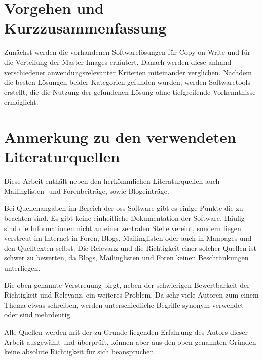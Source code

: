\section{Vorgehen und Kurzzusammenfassung} 

Zunächst werden die vorhandenen Softwarelösungen für Copy-on-Write und für die Verteilung der Master-Images erläutert. Danach werden diese anhand verschiedener anwendungsrelevanter Kriterien miteinander verglichen. Nachdem die besten Lösungen beider Kategorien gefunden wurden, werden Softwaretools erstellt, die die Nutzung der gefundenen Lösung ohne tiefgreifende Vorkenntnisse ermöglicht.

\section{Anmerkung zu den verwendeten Literaturquellen}
Diese Arbeit enthält neben den herkömmlichen Literaturquellen auch Mailinglisten- und Forenbeiträge, sowie Blogeinträge.

Bei Quellenangaben im Bereich der \gls{oss} Software gibt es einige Punkte die zu beachten sind. Es gibt keine einheitliche Dokumentation der Software. Häufig sind die Informationen nicht an einer zentralen Stelle vereint, sondern liegen verstreut im Internet in Foren, Blogs, Mailinglisten oder auch in Manpages und den Quelltexten selbst. Die Relevanz und die Richtigkeit einer solcher Quellen ist schwer zu bewerten, da Blogs, Mailinglisten und Foren keinen Beschränkungen unterliegen. \begin{comment} Das heißt, jeder der Willens ist zu einem Thema etwas zu schreiben, kann dies auch tun. \end{comment} 

Die oben genannte Verstreuung birgt, neben der schwierigen Bewertbarkeit der Richtigkeit und Relevanz, ein weiteres Problem. Da sehr viele Autoren zum einem Thema etwas schreiben, werden unterschiedliche Begriffe synonym verwendet oder sind mehrdeutig.

Alle Quellen werden mit der zu Grunde liegenden Erfahrung des Autors dieser Arbeit ausgewählt und überprüft, können aber aus den oben genannten Gründen keine absolute Richtigkeit für sich beanspruchen.
